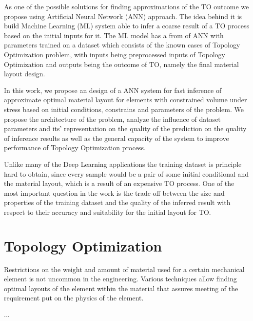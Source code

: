 As one of the possible solutions for finding approximations of the TO outcome we propose using Artificial Neural Network (ANN) approach.
The idea behind it is build Machine Learning (ML) system able to infer a coarse result of a TO process based on the initial inputs for it.
The ML model has a from of ANN with parameters trained on a dataset which consists of the known cases of Topology Optimization problem, with inputs being preprocessed inputs of Topology Optimization and outputs being the outcome of TO, namely the final material layout design.

In this work, we propose an design of a ANN system for fast inference of approximate optimal material layout for elements with constrained volume under stress based on initial conditions, constrains and parameters of the problem. 
We propose the architecture of the problem, analyze the influence of dataset parameters and its' representation on the quality of the prediction on the quality of inference results as well as the general capacity of the system to improve performance of Topology Optimization process.  


Unlike many of the Deep Learning applications the training dataset is principle hard to obtain, since every sample would be a pair of some initial conditional and the material layout, which is a result of an expensive TO process. 
One of the most important question in the work is the trade-off between the size and properties of the training dataset and the quality of the inferred result with respect to their accuracy and suitability for the initial layout for TO.



\section{Topology Optimization}

Restrictions on the weight and amount of material used for a certain mechanical element is not uncommon in the engineering.
Various techniques allow finding optimal layouts of the element within the material that assures meeting of the requirement put on the physics of the element. 

...

